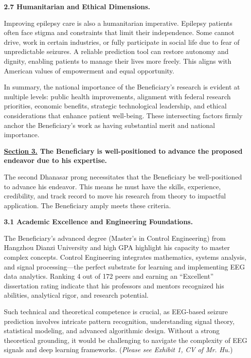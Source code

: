 \documentclass{article}
\begin{document}
{\bf 2.7 Humanitarian and Ethical Dimensions. }

Improving epilepsy care is also a humanitarian imperative. Epilepsy patients often face stigma and constraints that limit their independence. Some cannot drive, work in certain industries, or fully participate in social life due to fear of unpredictable seizures. A reliable prediction tool can restore autonomy and dignity, enabling patients to manage their lives more freely. This aligns with American values of empowerment and equal opportunity.

In summary, the national importance of the Beneficiary’s research is evident at multiple levels: public health improvements, alignment with federal research priorities, economic benefits, strategic technological leadership, and ethical considerations that enhance patient well-being. These intersecting factors firmly anchor the Beneficiary’s work as having substantial merit and national importance.


\clearpage

{\bf \underline{Section 3.} The Beneficiary is well-positioned to advance the proposed endeavor due to his expertise. }

The second Dhanasar prong necessitates that the Beneficiary be well-positioned to advance his endeavor. This means he must have the skills, experience, credibility, and track record to move his research from theory to impactful application. The Beneficiary amply meets these criteria.


{\bf 3.1 Academic Excellence and Engineering Foundations.}

The Beneficiary’s advanced degree (Master’s in Control Engineering) from Hangzhou Dianzi University and high GPA highlight his capacity to master complex concepts. Control Engineering integrates mathematics, systems analysis, and signal processing—the perfect substrate for learning and implementing EEG data analytics. Ranking 4 out of 172 peers and earning an “Excellent” dissertation rating indicate that his professors and mentors recognized his abilities, analytical rigor, and research potential.

Such technical and theoretical competence is crucial, as EEG-based seizure prediction involves intricate pattern recognition, understanding signal theory, statistical modeling, and advanced algorithmic design. Without a strong theoretical grounding, it would be challenging to navigate the complexity of EEG signals and deep learning frameworks. ({\it Please see Exhibit 1, CV of Mr. Hu.}) 
\end{document}
